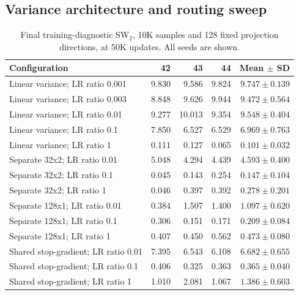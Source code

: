 \documentclass[11pt,a4paper]{article}
\begin{document}
\subsection{Variance architecture and routing sweep}
\begin{table}[H]\centering\small
\caption{Final training-diagnostic SW$_2$, 10K samples and 128 fixed projection directions, at 50K updates. All seeds are shown.}
\begin{tabular}{@{}>{\raggedright\arraybackslash}p{5cm}rrrr@{}}
\toprule
Configuration & 42 & 43 & 44 & Mean $\pm$ SD \\ \midrule
Linear variance; LR ratio 0.001 & 9.830 & 9.586 & 9.824 & $9.747\pm0.139$ \\
Linear variance; LR ratio 0.003 & 8.848 & 9.626 & 9.944 & $9.472\pm0.564$ \\
Linear variance; LR ratio 0.01 & 9.277 & 10.013 & 9.354 & $9.548\pm0.404$ \\
Linear variance; LR ratio 0.1 & 7.850 & 6.527 & 6.529 & $6.969\pm0.763$ \\
Linear variance; LR ratio 1 & 0.111 & 0.127 & 0.065 & $0.101\pm0.032$ \\
Separate 32x2; LR ratio 0.01 & 5.048 & 4.294 & 4.439 & $4.593\pm0.400$ \\
Separate 32x2; LR ratio 0.1 & 0.045 & 0.143 & 0.254 & $0.147\pm0.104$ \\
Separate 32x2; LR ratio 1 & 0.046 & 0.397 & 0.392 & $0.278\pm0.201$ \\
Separate 128x1; LR ratio 0.01 & 0.384 & 1.507 & 1.400 & $1.097\pm0.620$ \\
Separate 128x1; LR ratio 0.1 & 0.306 & 0.151 & 0.171 & $0.209\pm0.084$ \\
Separate 128x1; LR ratio 1 & 0.407 & 0.450 & 0.562 & $0.473\pm0.080$ \\
Shared stop-gradient; LR ratio 0.01 & 7.395 & 6.543 & 6.108 & $6.682\pm0.655$ \\
Shared stop-gradient; LR ratio 0.1 & 0.406 & 0.325 & 0.363 & $0.365\pm0.040$ \\
Shared stop-gradient; LR ratio 1 & 1.010 & 2.081 & 1.067 & $1.386\pm0.603$ \\
\bottomrule\end{tabular}\end{table}
\end{document}
